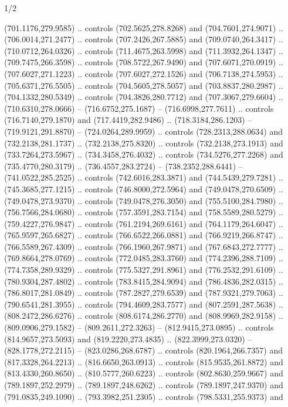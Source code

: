 \begin{flagdescription}{1/2}
\begin{scope}[shift={(2*\flaglength/3-0.25*\rb,0.51333\flagwidth)},scale=0.001715\flagwidth*\stretchfactor]
\begin{scope}[y=-1pt, x=1pt,cm={{1.04354,0.0,0.0,1.01818,(-827,-297)}}]
\begin{scope}[draw=black,line width=0.015\flagwidth]
\begin{scope}[fill=gold]
  (701.1176,279.9585) .. controls (702.5625,278.8268) and (704.7601,274.9071) ..
  (706.0014,271.2477) .. controls (707.2426,267.5885) and (709.0740,264.3417) ..
  (710.0712,264.0326) .. controls (711.4675,263.5998) and (711.3932,264.1347) ..
  (709.7475,266.3598) .. controls (708.5722,267.9490) and (707.6071,270.0919) ..
  (707.6027,271.1223) .. controls (707.6027,272.1526) and (706.7138,274.5953) ..
  (705.6371,276.5505) .. controls (704.5605,278.5057) and (703.8837,280.2987) ..
  (704.1332,280.5349) .. controls (704.3826,280.7712) and (707.3067,279.6604) ..
  (710.6310,278.0666) -- (716.6752,275.1687) -- (716.6998,277.7611) .. controls
  (716.7140,279.1870) and (717.4419,282.9486) .. (718.3184,286.1203) --
  (719.9121,291.8870) -- (724.0264,289.9959) .. controls (728.2313,288.0634) and
  (732.2138,281.1737) .. (732.2138,275.8320) .. controls (732.2138,273.1913) and
  (733.7264,273.5967) .. (734.3458,276.4032) .. controls (734.5276,277.2268) and
  (735.4770,280.3179) .. (736.4557,283.2724) -- (738.2352,288.6441) --
  (741.0522,285.2525) .. controls (742.6016,283.3871) and (744.5439,279.7281) ..
  (745.3685,277.1215) .. controls (746.8000,272.5964) and (749.0478,270.6509) ..
  (749.0478,273.9370) .. controls (749.0478,276.3050) and (755.5100,284.7980) ..
  (756.7566,284.0680) .. controls (757.3591,283.7154) and (758.5589,280.5279) ..
  (759.4227,276.9847) .. controls (761.2194,269.6161) and (764.1179,264.6047) ..
  (765.9597,265.6827) .. controls (766.6522,266.0881) and (766.9219,266.8747) ..
  (766.5589,267.4309) .. controls (766.1960,267.9871) and (767.6843,272.7777) ..
  (769.8664,278.0769) .. controls (772.0485,283.3760) and (774.2396,288.7109) ..
  (774.7358,289.9329) .. controls (775.5327,291.8961) and (776.2532,291.6109) ..
  (780.9304,287.4802) .. controls (783.8415,284.9094) and (786.4836,282.0315) ..
  (786.8017,281.0849) .. controls (787.2827,279.6539) and (787.9321,279.7063) ..
  (790.6541,281.3955) .. controls (794.4609,283.7577) and (807.2591,287.5638) ..
  (808.2472,286.6276) .. controls (808.6174,286.2770) and (808.9969,282.9158) ..
  (809.0906,279.1582) -- (809.2611,272.3263) -- (812.9415,273.0895) .. controls
  (814.9657,273.5093) and (819.2220,273.4835) .. (822.3999,273.0320) --
  (828.1778,272.2115) -- (823.0286,268.6787) .. controls (820.1964,266.7357) and
  (817.3328,264.2213) .. (816.6650,263.0913) .. controls (815.9535,261.8872) and
  (813.4330,260.8650) .. (810.5777,260.6223) .. controls (802.8630,259.9667) and
  (789.1897,252.2979) .. (789.1897,248.6262) .. controls (789.1897,247.9370) and
  (791.0835,249.1090) .. (793.3982,251.2305) .. controls (798.5331,255.9373) and

\end{scope}
\end{scope}
\end{scope}
\end{scope}
\end{flagdescription}
